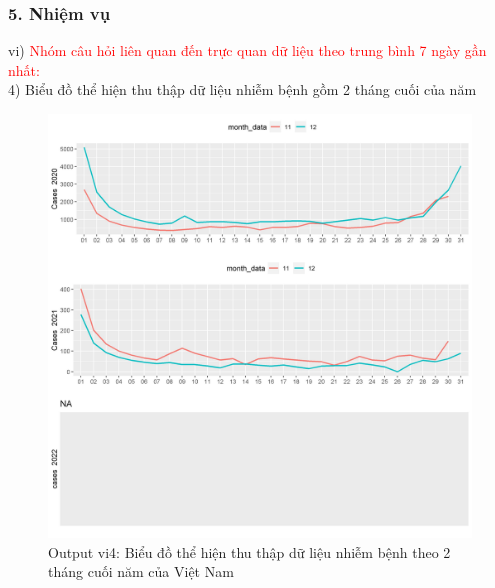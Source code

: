 \documentclass[english,10pt,table]{beamer}
\begin{document}
\begin{frame}[fragile]
\frametitle{5.  Nhiệm vụ}
vi) \textcolor{red}{Nhóm câu hỏi liên quan đến trực quan dữ liệu theo trung bình 7 ngày gần nhất:}\\
    4) Biểu đồ thể hiện thu thập dữ liệu nhiễm bệnh gồm 2 tháng cuối của năm
	\begin{figure}[h!]
	\begin{center}
		    \includegraphics[scale = 0.26]{Images/VI/vi4 Indonesia .jpeg}
		     \caption{Output vi4: Biểu đồ thể hiện thu thập dữ liệu nhiễm bệnh theo 2 tháng cuối năm của Việt Nam}
		\end{center}
		\end{figure}
\end{frame}
\end{document}
